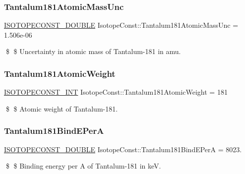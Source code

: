 \subsubsection{\texorpdfstring{Tantalum181\+Atomic\+Mass\+Unc}{Tantalum181AtomicMassUnc}}
{\footnotesize\ttfamily \mbox{\hyperlink{group___isotope_const-_macros_ga8f45a7272ce02c0b4c65c44636ed719a}{I\+S\+O\+T\+O\+P\+E\+C\+O\+N\+S\+T\+\_\+\+D\+O\+U\+B\+LE}} Isotope\+Const\+::\+Tantalum181\+Atomic\+Mass\+Unc = 1.\+506e-\/06}

\$ \$ Uncertainty in atomic mass of Tantalum-\/181 in amu. \mbox{\label{group___isotope_const-_tantalum-_ta181_ga3f02affff03bfbbf90a4f160edc06dd0}} 
\subsubsection{\texorpdfstring{Tantalum181\+Atomic\+Weight}{Tantalum181AtomicWeight}}
{\footnotesize\ttfamily \mbox{\hyperlink{group___isotope_const-_macros_ga5f18360b3e99483a35c32d789e62621c}{I\+S\+O\+T\+O\+P\+E\+C\+O\+N\+S\+T\+\_\+\+I\+NT}} Isotope\+Const\+::\+Tantalum181\+Atomic\+Weight = 181}

\$ \$ Atomic weight of Tantalum-\/181. \mbox{\label{group___isotope_const-_tantalum-_ta181_ga270f198de44655662e484b01341f9d29}} 
\subsubsection{\texorpdfstring{Tantalum181\+Bind\+E\+PerA}{Tantalum181BindEPerA}}
{\footnotesize\ttfamily \mbox{\hyperlink{group___isotope_const-_macros_ga8f45a7272ce02c0b4c65c44636ed719a}{I\+S\+O\+T\+O\+P\+E\+C\+O\+N\+S\+T\+\_\+\+D\+O\+U\+B\+LE}} Isotope\+Const\+::\+Tantalum181\+Bind\+E\+PerA = 8023.}

\$ \$ Binding energy per A of Tantalum-\/181 in keV. \mbox{\label{group___isotope_const-_tantalum-_ta181_ga7d1df80a72110531c29a756619328311}} 

